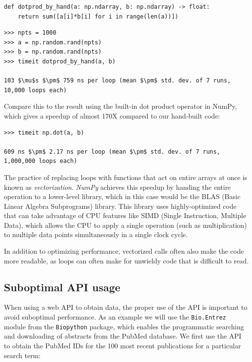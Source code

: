 \begin{lstlisting}[style=Pythonshort]
def dotprod_by_hand(a: np.ndarray, b: np.ndarray) -> float:
    return sum([a[i]*b[i] for i in range(len(a))])
\end{lstlisting}

\begin{lstlisting}[style=repl]
>>> npts = 1000
>>> a = np.random.rand(npts)
>>> b = np.random.rand(npts)
>>> timeit dotprod_by_hand(a, b)

103 $\mu$s $\pm$ 759 ns per loop (mean $\pm$ std. dev. of 7 runs, 10,000 loops each)
\end{lstlisting}

Compare this to the result using the built-in dot product operator in NumPy, which gives a speedup of almost 170X compared to our hand-built code:

\begin{lstlisting}[style=replshort, mathescape=true]
>>> timeit np.dot(a, b)

609 ns $\pm$ 2.17 ns per loop (mean $\pm$ std. dev. of 7 runs, 1,000,000 loops each)
\end{lstlisting}

The practice of replacing loops with functions that act on entire arrays at once is known as \textit{vectorization}. \textit{NumPy} achieves this speedup by handing the entire operation to a lower-level library, which in this case would be the BLAS (Basic Linear Algebra Subprograms) library.  This library uses highly-optimized code that can take advantage of CPU features like SIMD (Single Instruction, Multiple Data), which allows the CPU to apply a single operation (such as multiplication) to multiple data points simultaneously in a single clock cycle.

In addition to optimizing performance, vectorized calls often also make the code more readable, as loops can often make for unwieldy code that is difficult to read.

\subsection{Suboptimal API usage}

When using a web API to obtain data, the proper use of the API is important to avoid suboptimal performance.  As an example we will use the \texttt{Bio.Entrez} module from the \texttt{Biopython} package, which enables the programmatic searching and downloading of abstracts from the PubMed database.  We first use the API to obtain the PubMed IDs for the 100 most recent publications for a particular search term:

